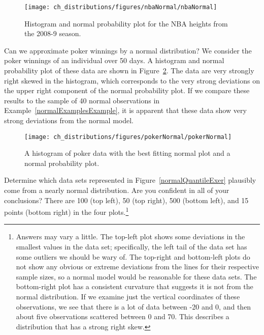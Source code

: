 \begin{figure}
\centering
\texttt{[image: ch\_distributions/figures/nbaNormal/nbaNormal]}
\caption{Histogram and normal probability plot for the NBA heights from the 2008-9 season.}
\label{nbaNormal}
\end{figure}

\begin{example}{Can we approximate poker winnings by a normal distribution? We consider the poker winnings of an individual over 50 days. A histogram and normal probability plot of these data are shown in Figure~\ref{pokerNormal}.}
The data are very strongly right skewed in the histogram, which corresponds to the very strong deviations on the upper right component of the normal probability plot. If we compare these results to the sample of 40 normal observations in Example~\ref{normalExamplesExample}, it is apparent that these data show very strong deviations from the normal model.
\end{example}

\begin{figure}
\centering
\texttt{[image: ch\_distributions/figures/pokerNormal/pokerNormal]}
\caption{A histogram of poker data with the best fitting normal plot and a normal probability plot.}
\label{pokerNormal}
\end{figure}

\begin{exercise}\label{normalQuantileExercise}
Determine which data sets represented in Figure~\ref{normalQuantileExer} plausibly come from a nearly normal distribution. Are you confident in all of your conclusions? There are 100 (top left), 50 (top right), 500 (bottom left), and 15 points (bottom right) in the four plots.\footnote{Answers may vary a little. The top-left plot shows some deviations in the smallest values in the data set; specifically, the left tail of the data set has some outliers we should be wary of. The top-right and bottom-left plots do not show any obvious or extreme deviations from the lines for their respective sample sizes, so a normal model would be reasonable for these data sets. The bottom-right plot has a consistent curvature that suggests it is not from the normal distribution. If we examine just the vertical coordinates of these observations, we see that there is a lot of data between -20 and 0, and then about five observations scattered between 0 and 70. This describes a distribution that has a strong right skew.}
\end{exercise}


